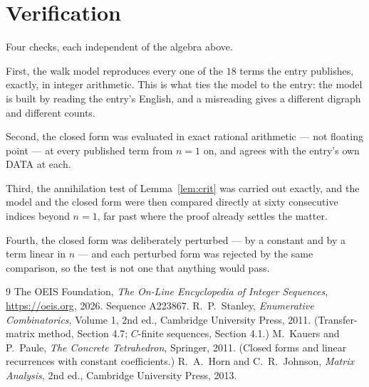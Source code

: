 \documentclass[11pt,a4paper]{article}
\theoremstyle{plain}
\theoremstyle{definition}
\begin{document}
\section{Verification}

Four checks, each independent of the algebra above.

First, the walk model reproduces every one of the $18$ terms the entry publishes,
exactly, in integer arithmetic. This is what ties the model to the entry: the model is built
by reading the entry's English, and a misreading gives a different digraph and different
counts.

Second, the closed form was evaluated in exact rational arithmetic --- not floating point ---
at every published term from $n=1$ on, and agrees with the entry's own DATA at each.

Third, the annihilation test of Lemma~\ref{lem:crit} was carried out exactly, and the model
and the closed form were then compared directly at sixty consecutive indices beyond
$n=1$, far past where the proof already settles the matter.

Fourth, the closed form was deliberately perturbed --- by a constant and by a term linear in
$n$ --- and each perturbed form was rejected by the same comparison, so the test is not one
that anything would pass.

\begin{thebibliography}{9}
 The OEIS Foundation, \emph{The On-Line Encyclopedia of Integer
Sequences}, \url{https://oeis.org}, 2026. Sequence A223867.
 R.~P.~Stanley, \emph{Enumerative Combinatorics}, Volume 1, 2nd ed.,
Cambridge University Press, 2011. (Transfer-matrix method, Section 4.7; $C$-finite sequences,
Section 4.1.)
 M.~Kauers and P.~Paule, \emph{The Concrete Tetrahedron}, Springer, 2011.
(Closed forms and linear recurrences with constant coefficients.)
 R.~A.~Horn and C.~R.~Johnson, \emph{Matrix Analysis}, 2nd ed., Cambridge
University Press, 2013.
\end{thebibliography}
\end{document}
